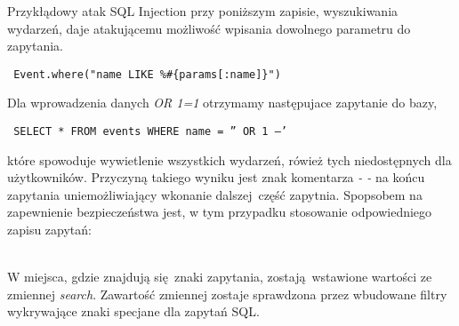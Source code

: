Przykłądowy atak SQL Injection przy poniższym zapisie, wyszukiwania wydarzeń, daje atakującemu możliwość wpisania dowolnego parametru do zapytania.

\begin{center}
  \texttt{ Event.where("name LIKE \%\#\{params[:name]\}") }
\end{center}

Dla wprowadzenia danych \emph{OR 1=1} otrzymamy następujace zapytanie do bazy,

\begin{center}
  \texttt{ SELECT * FROM events WHERE name = '' OR 1 --' }
\end{center}

które spowoduje wywietlenie wszystkich wydarzeń, rówież tych niedostępnych dla użytkowników. Przyczyną takiego wyniku jest znak komentarza \emph{- -} na końcu zapytania uniemożliwiający wkonanie dalszej część zapytnia.
Spopsobem na zapewnienie bezpieczeństwa jest, w tym przypadku stosowanie odpowiedniego zapisu zapytań:

\begin{code}
  
\end{code}\\

W miejsca, gdzie znajdują się znaki zapytania, zostają wstawione wartości ze zmiennej \emph{search}. Zawartość zmiennej zostaje sprawdzona przez wbudowane filtry wykrywające znaki specjane dla zapytań SQL.
